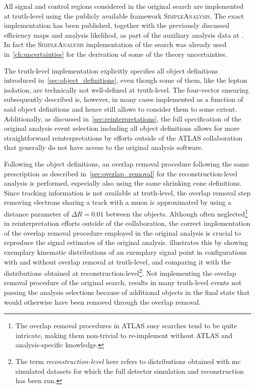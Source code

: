 All signal and control regions considered in the original \onelepton search are implemented at truth-level using the publicly available framework \textsc{SimpleAnalysis}. The exact implementation has been published, together with the previously discussed efficiency maps and analysis likelihod, as part of the auxiliary analysis data at \cite{HEPdata_1Lbb}. In fact the \textsc{SimpleAnalysis} implementation of the search was already used in~\cref{ch:uncertainties} for the derivation of some of the theory uncertainties.

The truth-level implementation explicitly specifies all object definitions introduced in~\cref{sec:object_definitions}, even though some of them, like the lepton isolation, are technically not well-defined at truth-level.
The four-vector smearing subsequently described is, however, in many cases implemented as a function of said object definitions and hence still allows to consider them to some extent.
Additionally, as discussed in~\cref{sec:reinterpretations}, the full specification of the original analysis event selection including all object definitions allows for more straightforward reinterpretations by efforts outside of the ATLAS collaboration that generally do not have access to the original analysis software.

Following the object definitions, an overlap removal procedure following the same prescription as described in~\cref{sec:overlap_removal} for the reconstruction-level analysis is performed, \ie especially also using the same shrinking cone definitions.
Since tracking information is not available at truth-level, the overlap removal step removing electrons sharing a track with a muon is approximated by using a distance parameter of $\Delta R = 0.01$ between the objects.
Although often neglected\footnote{The overlap removal procedures in ATLAS \gls{susy} searches tend to be quite intricate, making them non-trivial to re-implement without ATLAS and analysis-specific knowledge.} in reinterpretation efforts outside of the collaboration, the correct implementation of the overlap removal procedure employed in the original analysis is crucial to reproduce the signal estimates of the original analysis.
 illustrates this by showing exemplary kinematic distributions of an exemplary signal point in configurations with and without overlap removal at truth-level, and comparing it with the distributions obtained at reconstruction-level\footnote{The term \textit{reconstruction-level} here refers to distributions obtained with \gls{mc} simulated datasets for which the full detector simulation and reconstruction has been run.}.
Not implementing the overlap removal procedure of the original \onelepton search, results in many truth-level events not passing the analysis selections because of additional objects in the final state that would otherwise have been removed through the overlap removal. 


